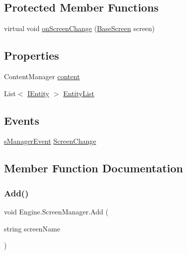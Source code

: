\subsection*{Protected Member Functions}
\begin{DoxyCompactItemize}
\item 
virtual void \hyperlink{a00538_a973c15b5fff9fb873ed988ea69ccbfd1}{on\+Screen\+Change} (\hyperlink{a00550}{Base\+Screen} screen)
\end{DoxyCompactItemize}
\subsection*{Properties}
\begin{DoxyCompactItemize}
\item 
Content\+Manager \hyperlink{a00538_aab6681c2803637c394081f3132dd2846}{content}
\item 
List$<$ \hyperlink{a00438}{I\+Entity} $>$ \hyperlink{a00538_a8fb99d85abd848bad9d850b742398801}{Entity\+List}
\end{DoxyCompactItemize}
\subsection*{Events}
\begin{DoxyCompactItemize}
\item 
\hyperlink{a00538_ad442d9999cb6f335509f21ddb533bd76}{s\+Manager\+Event} \hyperlink{a00538_ab29ea82cff043c98756eaa9f538a72e7}{Screen\+Change}
\end{DoxyCompactItemize}


\subsection{Member Function Documentation}
\mbox{\label{a00538_ae459e146f1e05789c4d5828cca4dead7}} 
\subsubsection{\texorpdfstring{Add()}{Add()}}
{\footnotesize\ttfamily void Engine.\+Screen\+Manager.\+Add (\begin{DoxyParamCaption}\item[{string}]{screen\+Name }\end{DoxyParamCaption})\hspace{0.3cm}{\ttfamily [inline]}}



